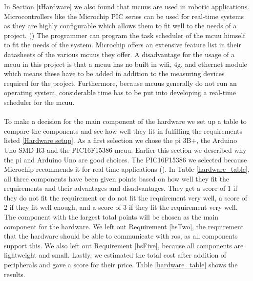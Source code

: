 \documentclass[12pt]{scrreprt}
\begin{document}
In Section \ref{tHardware} we also found that \gls{mcuu}s are used in robotic applications. Microcontrollers like the Microchip PIC series can be used for real-time systems as they are highly configurable which  allows them to fit well to the needs of a project. (\cite{micro}) The programmer can program the task scheduler of the \gls{mcuu} himself to fit the needs of the system. Microchip offers an extensive feature list in their datasheets of the various \gls{mcuu}s they offer. A disadvantage for the usage of a \gls{mcuu} in this project is that a \gls{mcuu} has no built in \gls{wifi}, \gls{4g}, and ethernet module which means these have to be added in addition to the measuring devices required for the project. Furthermore, because \gls{mcuu}s generally do not run an operating system, considerable time has to be put into developing a real-time scheduler for the \gls{mcuu}.
\\\\
To make a decision for the main component of the hardware we set up a table to compare the components and see how well they fit in fulfilling the requirements listed \ref{Hardware setup}. As a first selection we chose the \gls{pi} 3B+, the Arduino Uno SMD R3 and the PIC16F15386 \gls{mcuu}. Earlier this section we described why the \gls{pi} and Arduino Uno are good choices. The PIC16F15386 we selected because Microchip recommends it for real-time applications (\cite{micro}).  In Table \ref{hardware_table}, all three components have been given points based on how well they fit the requirements and their advantages and disadvantages. They get a score of 1 if they do not fit the requirement or do not fit the requirement very well, a score of 2 if they fit well enough, and a score of 3 if they fit the requirement very well. The component with the largest total points will be chosen as the main component for the hardware. We left out Requirement \ref{hsTwo}, the requirement that the hardware should be able to communicate with \acrshort{ros}, as all components support this. We also left out Requirement \ref{hsFive}, because all components are lightweight and small. Lastly, we estimated the total cost after addition of peripherals and gave a score for their price. Table \ref{hardware_table} shows the results.
\end{document}
